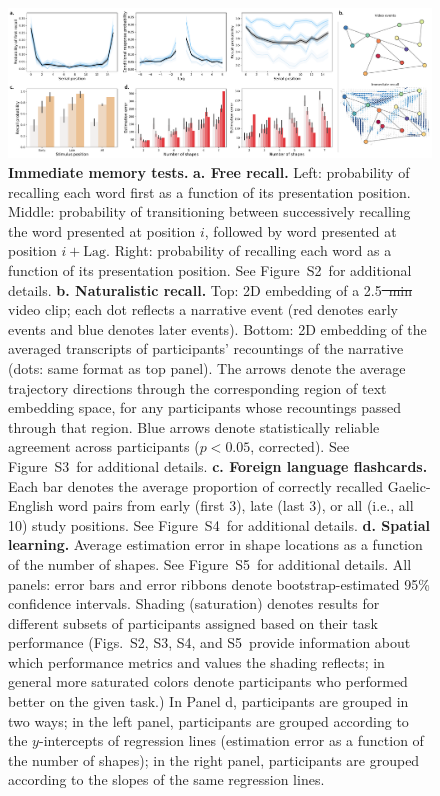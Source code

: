 \documentclass[10pt]{article}
\newcommand{\frDetail}{S2}
\newcommand{\natDetail}{S3}
\newcommand{\vocabDetail}{S4}
\newcommand{\spatialDetail}{S5}
\providecommand{\DIFaddtex}[1]{{\protect\color{blue}\uwave{#1}}} %
\providecommand{\DIFdeltex}[1]{{\protect\color{red}\sout{#1}}}                      %
\providecommand{\DIFaddFL}[1]{\DIFadd{#1}} %
\providecommand{\DIFdelFL}[1]{\DIFdel{#1}} %
\providecommand{\DIFaddbeginFL}{} %
\providecommand{\DIFaddendFL}{} %
\providecommand{\DIFdelbeginFL}{} %
\providecommand{\DIFdelendFL}{} %
\providecommand{\DIFadd}[1]{\texorpdfstring{\DIFaddtex{#1}}{#1}} %
\providecommand{\DIFdel}[1]{\texorpdfstring{\DIFdeltex{#1}}{}} %
\newcommand{\DIFscaledelfig}{0.5}
\newlength{\DIFdelgraphicswidth} %
\newlength{\DIFdelgraphicsheight} %
\newcommand{\DIFaddincludegraphics}[2][]{{\color{blue}\fbox{\DIFOincludegraphics[#1]{#2}}}} %
\newcommand{\DIFdelincludegraphics}[2][]{%
\sbox{\DIFdelgraphicsbox}{\DIFOincludegraphics[#1]{#2}}%
\settoboxwidth{\DIFdelgraphicswidth}{\DIFdelgraphicsbox} %
\settoboxtotalheight{\DIFdelgraphicsheight}{\DIFdelgraphicsbox} %
\scalebox{\DIFscaledelfig}{%
\parbox[b]{\DIFdelgraphicswidth}{\usebox{\DIFdelgraphicsbox}\\[-\baselineskip] \rule{\DIFdelgraphicswidth}{0em}}\llap{\resizebox{\DIFdelgraphicswidth}{\DIFdelgraphicsheight}{%
\setlength{\unitlength}{\DIFdelgraphicswidth}%
\begin{picture}(1,1)%
\thicklines\linethickness{2pt} %
{\color[rgb]{1,0,0}\put(0,0){\framebox(1,1){}}}%
{\color[rgb]{1,0,0}\put(0,0){\line( 1,1){1}}}%
{\color[rgb]{1,0,0}\put(0,1){\line(1,-1){1}}}%
\end{picture}%
}\hspace*{3pt}}} %
} %
\DeclareRobustCommand{\DIFaddbeginFL}{\DIFOaddbeginFL \let\includegraphics\DIFaddincludegraphics} %
\DeclareRobustCommand{\DIFaddendFL}{\DIFOaddendFL \let\includegraphics\DIFOincludegraphics} %
\DeclareRobustCommand{\DIFdelbeginFL}{\DIFOdelbeginFL \let\includegraphics\DIFdelincludegraphics} %
\DeclareRobustCommand{\DIFdelendFL}{\DIFOaddendFL \let\includegraphics\DIFOincludegraphics} %
\begin{document}
\begin{figure}[tp]
\centering
\includegraphics[width=1\textwidth]{figs/behavior_overview_immediate}
\caption{\textbf{Immediate memory tests.}  \textbf{a. Free recall.}
  Left: probability of recalling each word first as a function of its
  presentation position.  Middle: probability of transitioning between
successively recalling the word presented at position $i$, followed by
word presented at position $i + \mathrm{Lag}$.  Right: probability of
recalling each word as a function of its presentation position.  See
Figure~\frDetail~for additional details.
\textbf{b. Naturalistic recall.}  Top: 2D embedding of a 2.5\DIFdelbeginFL \DIFdelFL{~min }\DIFdelendFL \DIFaddbeginFL \DIFaddFL{-min }\DIFaddendFL video
clip; each dot reflects a narrative event (red denotes early events
and blue denotes later events).  Bottom: 2D embedding of the averaged
transcripts of participants' recountings of the narrative (dots: same
format as top panel).  The arrows denote the average trajectory
directions through the corresponding region of text embedding space,
for any participants whose recountings passed through that region.
Blue arrows denote statistically reliable agreement across
participants ($p < 0.05$, corrected).  See Figure~\natDetail~for
additional details.  \textbf{c. Foreign language
  flashcards.} Each bar denotes the average proportion of correctly
recalled Gaelic-English word pairs from early (first 3), late (last
3), or all (i.e., all 10) study positions.  See
Figure~\vocabDetail~for additional details.  \textbf{d. Spatial
  learning.}  Average estimation error in shape locations as a
function of the number of shapes.  See Figure~\spatialDetail~for
additional details.  All panels: error bars and error
ribbons denote bootstrap-estimated 95\% confidence intervals.  Shading
(saturation) denotes results for different subsets of participants
assigned based on their task performance (Figs.~\frDetail,
\natDetail, \vocabDetail, and \spatialDetail~provide information about
which performance metrics and values the shading reflects; in general
more saturated colors denote participants who performed better on the
given task.)  In Panel d, participants are grouped in two ways; in the
left panel, participants are grouped according to the $y$-intercepts of regression lines (estimation error as a
function of the number of shapes); in the right panel, participants
are grouped according to the slopes of the same regression lines.}
\label{fig:immediate_behavior}
\end{figure}
\end{document}
